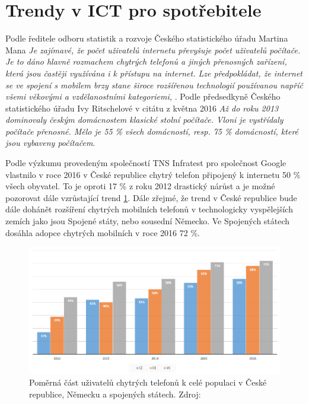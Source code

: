 
\section{Trendy v ICT pro spotřebitele}\label{trendy} 

Podle ředitele odboru statistik a rozvoje Českého statistického úřadu Martina Mana \textit{Je zajímavé, že počet uživatelů internetu převyšuje počet uživatelů počítače. Je to dáno hlavně rozmachem chytrých telefonů a jiných přenosných zařízení, která jsou častěji využívána i k přístupu na internet. Lze předpokládat, že internet se ve spojení s mobilem brzy stane široce rozšířenou technologií používanou napříč všemi věkovými a vzdělanostními  kategoriemi,} . Podle předsedkyně Českého statistického úřadu Ivy Ritschelové v citátu z května 2016 \textit{Až do roku 2013 dominovaly českým domácnostem klasické stolní počítače. Vloni je vystřídaly počítače přenosné. Mělo je 55 \% všech domácností, resp. 75 \% domácností, které jsou vybaveny počítačem}.

Podle výzkumu provedeným společností TNS Infratest pro společnost Google vlastnilo v roce 2016 v České republice chytrý telefon připojený k internetu 50 \% všech obyvatel.   To je oproti 17 \% z roku 2012 drastický nárůst a je možné pozorovat dále vzrůstající trend \ref{uzivateleSmartphone}. Dále zřejmé, že trend v České republice bude dále dohánět rozšíření chytrých mobilních telefonů v technologicky vyspělejších zemích jako jsou Spojené státy, nebo sousední Německo. Ve Spojených státech dosáhla adopce chytrých mobilních v roce 2016 72 \%.

\begin{figure}[h!]\label{uzivateleSmartphone}
\centering
\includegraphics[width=13cm]{img/uzivateleSmartphone}
\caption{Poměrná část uživatelů chytrých telefonů k celé populaci v České republice, Německu a spojených státech. Zdroj: } 
\end{figure}


